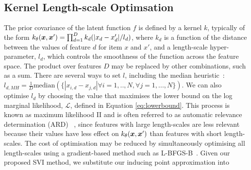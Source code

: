 

\subsection{Kernel Length-scale Optimsation}

The prior covariance of the latent function $f$ is defined by a kernel $k$, 
typically of the form $k_{\theta}(\boldsymbol x, \boldsymbol x') = \prod_{d=1}^D k_d(|x_d - x_d'| / l_d)$, 
where $k_d$ is a function of the distance between the values of feature $d$ 
for item $x$ and $x'$, and a length-scale hyper-parameter, $l_d$, which 
controls the smoothness of the function across the feature space.
The product over features $D$ may be replaced by other combinations, 
such as a sum. 
There are several ways to set $l$, including the median heuristic~\cite{gretton2012optimal}: 
$ l_{d,MH} = \frac{1}{D} \mathrm{median}( \{ |x_{i,d} - x_{j,d}| \forall i=1,..,N, \forall j=1,...,N\} ) $.
We can also optimise $l_d$ by choosing the value that maximises the lower bound on the 
log marginal likelihood, $\mathcal{L}$, defined in Equation \ref{eq:lowerbound}. 
This process is known as maximum likelihood II and is often referred to as automatic relevance determination (ARD)
~\cite{rasmussen_gaussian_2006}, since features with large length-scales are less relevant because their values
have less effect on $k_{\theta}(\boldsymbol x, \boldsymbol x') $ than features with short length-scales.
The cost of optimisation may be reduced by simultaneously optimising all length-scales 
using a gradient-based method such as L-BFGS-B~\cite{zhu1997algorithm}.
Given our proposed SVI method, we substitute our inducing point approximation into 
